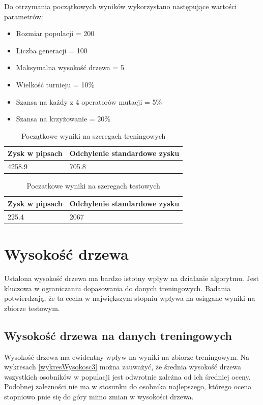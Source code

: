 \documentclass[twoside]{iisthesis}
\begin{document}
Do otrzymania początkowych wyników wykorzystano następujące wartości parametrów:
\begin{itemize}
\item Rozmiar populacji = 200
\item Liczba generacji = 100
\item Maksymalna wysokość drzewa = 5
\item Wielkość turnieju = 10\%
\item Szansa na każdy z 4 operatorów mutacji = 5\%
\item Szansa na krzyżowanie = 20\%
\end{itemize}

\begin{table}[h]
\center
\caption{Początkowe wyniki na szeregach treningowych}
\label{wyniki1train}
\begin{tabular}{|l|l|}
  \hline
  Zysk w pipsach& Odchylenie standardowe zysku\\
  \hline
4258.9 & 705.8 \\
  \hline
\end{tabular} 
\end{table}

\begin{table}[h]
\center
\caption{Poczatkowe wyniki na szeregach testowych}
\label{wyniki1test}
\begin{tabular}{|l|l|}
  \hline
  Zysk w pipsach& Odchylenie standardowe zysku\\
  \hline
225.4 & 2067 \\
  \hline
\end{tabular} 
\end{table}

\section {Wysokość drzewa}

Ustalona wysokość drzewa ma bardzo istotny wpływ na działanie algorytmu. Jest kluczowa w ograniczaniu dopasowania do danych treningowych. Badania potwierdzają, że ta cecha w największym stopniu wpływa na osiągane wyniki na zbiorze testowym. 

\subsection{Wysokość drzewa na danych treningowych}

Wysokość drzewa ma ewidentny wpływ na wyniki na zbiorze treningowym. Na wykresach \ref{wykresWysokosc3} można zauważyć, że średnia wysokość drzewa wszystkich osobników w populacji jest odwrotnie zależna od ich średniej oceny. Podobnej zależności nie ma w stosunku do osobnika najlepszego, którego ocena stopniowo pnie się do góry mimo zmian w wysokości drzewa.
\end{document}
